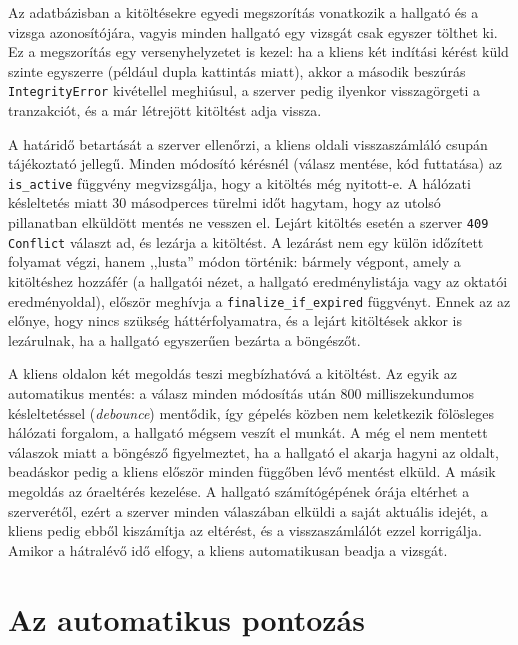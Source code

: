 Az adatbázisban a kitöltésekre egyedi megszorítás vonatkozik a hallgató és a vizsga azonosítójára,
vagyis minden hallgató egy vizsgát csak egyszer tölthet ki. Ez a megszorítás egy versenyhelyzetet
is kezel: ha a kliens két indítási kérést küld szinte egyszerre (például dupla kattintás miatt),
akkor a második beszúrás \texttt{IntegrityError} kivétellel meghiúsul, a szerver pedig ilyenkor
visszagörgeti a tranzakciót, és a már létrejött kitöltést adja vissza.

A határidő betartását a szerver ellenőrzi, a kliens oldali visszaszámláló csupán tájékoztató
jellegű. Minden módosító kérésnél (válasz mentése, kód futtatása) az \texttt{is\_active} függvény
megvizsgálja, hogy a kitöltés még nyitott-e. A hálózati késleltetés miatt 30 másodperces türelmi
időt hagytam, hogy az utolsó pillanatban elküldött mentés ne vesszen el. Lejárt kitöltés esetén
a szerver \texttt{409 Conflict} választ ad, és lezárja a kitöltést. A lezárást nem egy külön
időzített folyamat végzi, hanem ,,lusta'' módon történik: bármely végpont, amely a kitöltéshez
hozzáfér (a hallgatói nézet, a hallgató eredménylistája vagy az oktatói eredményoldal), először
meghívja a \texttt{finalize\_if\_expired} függvényt. Ennek az az előnye, hogy nincs szükség
háttérfolyamatra, és a lejárt kitöltések akkor is lezárulnak, ha a hallgató egyszerűen bezárta a
böngészőt.

A kliens oldalon két megoldás teszi megbízhatóvá a kitöltést. Az egyik az automatikus mentés:
a válasz minden módosítás után 800 milliszekundumos késleltetéssel (\textit{debounce}) mentődik,
így gépelés közben nem keletkezik fölösleges hálózati forgalom, a hallgató mégsem veszít el
munkát. A még el nem mentett válaszok miatt a böngésző figyelmeztet, ha a hallgató el akarja
hagyni az oldalt, beadáskor pedig a kliens először minden függőben lévő mentést elküld. A másik
megoldás az óraeltérés kezelése. A hallgató számítógépének órája eltérhet a szerverétől, ezért a
szerver minden válaszában elküldi a saját aktuális idejét, a kliens pedig ebből kiszámítja az
eltérést, és a visszaszámlálót ezzel korrigálja. Amikor a hátralévő idő elfogy, a kliens
automatikusan beadja a vizsgát.

\section{Az automatikus pontozás}
\label{sec:pontozas}

